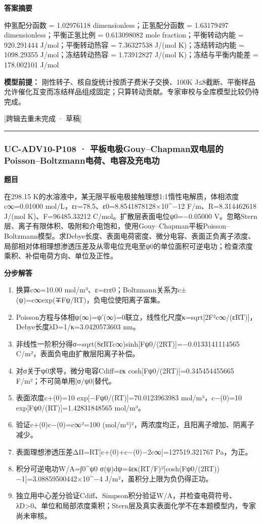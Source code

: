 \documentclass[UTF8,11pt,a4paper]{ctexart}
\begin{document}
\noindent\textbf{答案摘要}\par
仲氢配分函数 = 1.02976118 dimensionless；正氢配分函数 = 1.63179497 dimensionless；平衡正氢比例 = 0.613098082 mole fraction；平衡转动内能 = 920.291444 J/mol；平衡转动热容 = 7.36327538 J/(mol K)；冻结转动内能 = 1098.29355 J/mol；冻结转动热容 = 1.73912827 J/(mol K)；冻结与平衡内能差 = 178.002101 J/mol\par
\noindent\textbf{模型前提：}
刚性转子、核自旋统计按质子费米子交换、100K J≤8截断、平衡样品允许催化互变而冻结样品组成固定；只算转动贡献。专家审校与全库模型比较仍待完成。\par
\noindent\textcolor{red!65!black}{[跨辑去重未完成 · 草稿]} \par
\medskip\hrule\medskip
{}
\subsubsection*{UC-ADV10-P108 · 平板电极Gouy–Chapman双电层的Poisson–Boltzmann电荷、电容及充电功}
\noindent\textbf{题目}\par
在298.15 K的水溶液中，某无限平板电极接触理想1:1惰性电解质，体相浓度c∞=0.01000 mol/L，εr=78.5、ε0=8.8541878128×10\textasciicircum{}−12 F/m、R=8.314462618 J/(mol K)、F=96485.33212 C/mol。扩散层表面电位ψ0=−0.05000 V。忽略Stern层、离子有限体积、吸附和介电饱和，使用Gouy–Chapman平板Poisson–Boltzmann模型。求Debye长度、表面电荷密度、微分电容、表面正负离子浓度、局部相对体相理想渗透压差及从零电位充电至ψ0的单位面积可逆电功；检查浓度乘积、补偿电荷方向、单位及正性。\par
\medskip\noindent\textbf{分步解答}
\begin{enumerate}
\item 换算c∞=10.00 mol/m³、ε=εrε0；Boltzmann关系为c±(ψ)=c∞exp(∓Fψ/RT)，负电位使阳离子富集。
\item Poisson方程与体相ψ(∞)=ψ'(∞)=0联立，线性化尺度κ=sqrt[2F²c∞/(εRT)]，Debye长度λD=1/κ=3.0420573603 nm。
\item 非线性一阶积分得σ=sqrt(8εRTc∞)sinh[Fψ0/(2RT)]=−0.0133141114565 C/m²，表面负电由扩散层阳离子补偿。
\item 对σ关于ψ0求导，微分电容Cdiff=εκ cosh[Fψ0/(2RT)]=0.345454455665 F/m²；不可简单用|σ/ψ0|替代。
\item 表面浓度c+(0)=10 exp[−Fψ0/(RT)]=70.0123963983 mol/m³，c−(0)=10 exp[Fψ0/(RT)]=1.42831848565 mol/m³。
\item 验证c+(0)c−(0)=c∞²=100 (mol/m³)²，两浓度均正，且阳离子增加、阴离子减少。
\item 表面理想渗透压差ΔΠ=RT[c+(0)+c−(0)−2c∞]=127519.321767 Pa，为正。
\item 积分可逆电功W/A=∫0\textasciicircum{}ψ0 σ(ψ)dψ=4εκ(RT/F)²[cosh(Fψ0/(2RT))−1]=3.08859500442×10\textasciicircum{}−4 J/m²，虽积分上限为负仍得正功。
\item 独立用中心差分验证Cdiff、Simpson积分验证W/A，并检查电荷符号、λD>0、单位和局部浓度乘积；Stern层及真实表面化学不在本题模型内，专家尚未审核。
\end{enumerate}
\end{document}

